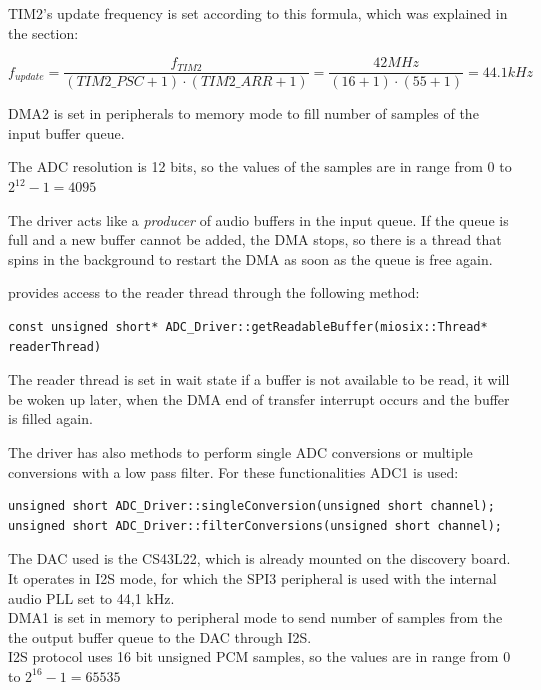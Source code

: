 TIM2's update frequency is set according to this formula, which was explained in the  section:

$$f_{update} = \frac{f_{TIM2}}{(TIM2\_PSC+1)\cdot(TIM2\_ARR+1)} = \frac{42MHz}{(16+1)\cdot(55+1)} = 44.1kHz$$

DMA2 is set in peripherals to memory mode to fill  number of samples of the input buffer queue.\par
    
The ADC resolution is 12 bits, so the values of the samples are in range from $0$ to $2^{12}-1 = 4095$
    
The driver acts like a \textit{producer} of audio buffers in the input queue.
If the queue is full and a new buffer cannot be added, the DMA stops, so there is a thread that spins in the background to restart the DMA as soon as the queue is free again.
  

 provides access to the reader thread through the following method: \\
\begin{lstlisting}
const unsigned short* ADC_Driver::getReadableBuffer(miosix::Thread* readerThread) 
\end{lstlisting}
The reader thread is set in wait state if a buffer is not available to be read, it will be woken up later, when the DMA end of transfer interrupt occurs and the buffer is filled again.\par
    
The driver has also methods to perform single ADC conversions or multiple conversions with a low pass filter.
For these functionalities ADC1 is used:\\
\begin{lstlisting}
unsigned short ADC_Driver::singleConversion(unsigned short channel);
unsigned short ADC_Driver::filterConversions(unsigned short channel);
\end{lstlisting}
    
\label{sec:DAC}
The DAC used is the CS43L22, which is already mounted on the discovery board.\\
It operates in I2S mode, for which the SPI3 peripheral is used with the internal audio PLL set to 44,1 kHz.\\
DMA1 is set in memory to peripheral mode to send  number of samples from the the output buffer queue to the DAC through I2S.\\  
I2S protocol uses 16 bit unsigned PCM samples, so the values are in range from $0$ to $2^{16}-1 = 65535$\par

